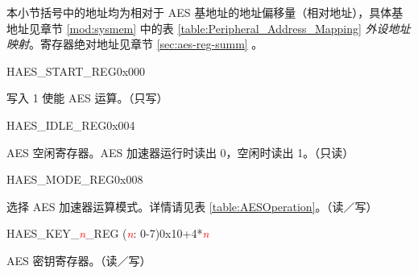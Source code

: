 本小节括号中的地址均为相对于 AES 基地址的地址偏移量（相对地址），具体基地址见章节 \ref{mod:sysmem} \textit{} 中的表 \ref{table:Peripheral_Address_Mapping} \textit{外设地址映射}。寄存器绝对地址见章节 \ref{sec:aes-reg-summ} \textit{}。

\begin{register}{H}{AES\_START\_REG}{0x000}\label{regdesc:AESSTARTREG}
%
%
\regnewline%
\begin{regdesc}\begin{reglist}
\item [AES\_START] 写入 1 使能 AES 运算。（只写）
\end{reglist}\end{regdesc}
\end{register}


\begin{register}{H}{AES\_IDLE\_REG}{0x004}\label{regdesc:AESIDLEREG}
%
%
\regnewline%
\begin{regdesc}\begin{reglist}
\item [AES\_IDLE] AES 空闲寄存器。AES 加速器运行时读出 0，空闲时读出 1。（只读）
\end{reglist}\end{regdesc}
\end{register}


\begin{register}{H}{AES\_MODE\_REG}{0x008}\label{regdesc:AESMODEREG}
%
%
\regnewline%
\begin{regdesc}\begin{reglist}
\item [AES\_MODE] 选择 AES 加速器运算模式。详情请见表 \ref{table:AESOperation}。（读／写）
\end{reglist}\end{regdesc}
\end{register}


\begin{register}{H}{AES\_KEY\_\textcolor{red}{\it{n}}\_REG (\textcolor{red}{\it{n}}: 0-7)}{0x10+4*\textcolor{red}{\it{n}}}\label{regdesc:AESKEYnREG}
%
\regnewline%
\begin{regdesc}\begin{reglist}
\item [AES\_KEY\_\textcolor{red}{\it{n}}\_REG (\textcolor{red}{\it{n}}: 0-7)]AES 密钥寄存器。（读／写）
\end{reglist}\end{regdesc}
\end{register}


